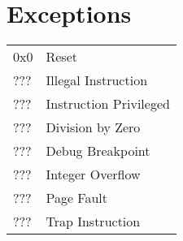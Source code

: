 \chapter{Exceptions}

\begin{tabular}{ |p{3cm}|p{4cm}|  }
    \hline
    0x0 & Reset \\
    ??? & Illegal Instruction \\
    ??? & Instruction Privileged \\
    ??? & Division by Zero \\
    ??? & Debug Breakpoint \\
    ??? & Integer Overflow \\
    ??? & Page Fault \\
    ??? & Trap Instruction \\
    \hline
\end{tabular}
